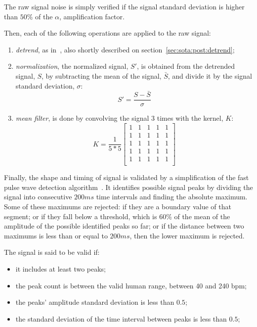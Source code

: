 The raw signal noise is simply verified if the signal standard deviation
is higher than $50\%$ of the $\alpha$, amplification factor.

Then, each of the following operations are applied to the raw signal:
\begin{enumerate}
  \item \emph{detrend}, as in~\cite{Tarvainen2002Advanced}, also shortly
        described on section~\ref{sec:sota:post:detrend};
  \item \emph{normalization}, the normalized signal, $S'$, is obtained from
        the detrended signal, $S$, by subtracting the mean of the signal,
        $\bar{S}$, and divide it by the signal standard deviation, $\sigma$:
        \begin{equation}
          S' = \frac{S - \bar{S}}{\sigma}
        \end{equation}
  \item \emph{mean filter}, is done by convolving the signal $3$ times with
        the kernel, $K$:
        \begin{equation}
          K = \frac{1}{5 * 5}
          \begin{bmatrix}
             1 & 1 & 1 & 1 & 1 \\
             1 & 1 & 1 & 1 & 1 \\
             1 & 1 & 1 & 1 & 1 \\
             1 & 1 & 1 & 1 & 1 \\
             1 & 1 & 1 & 1 & 1 \\
          \end{bmatrix}
        \end{equation}
\end{enumerate}

Finally, the shape and timing of signal is validated by a simplification of
the fast pulse wave detection algorithm~\cite{Nenova2010Automated}.
It identifies possible signal peaks by dividing the signal into consecutive
$200 ms$ time intervals and finding the absolute maximum. Some of these maximums
are rejected: if they are a boundary value of that segment; or if they fall
below a threshold, which is $60\%$ of the mean of the amplitude of the possible
identified peaks so far; or if the distance between two maximums is less than
or equal to $200 ms$, then the lower maximum is rejected.

The signal is said to be valid if:
\begin{itemize}
  \item it includes at least two peaks;
  \item the peak count is between the valid human range, between 40 and 240 bpm;
  \item the peaks' amplitude standard deviation is less than $0.5$;
  \item the standard deviation of the time interval between peaks is less
        than $0.5$;
\end{itemize}

